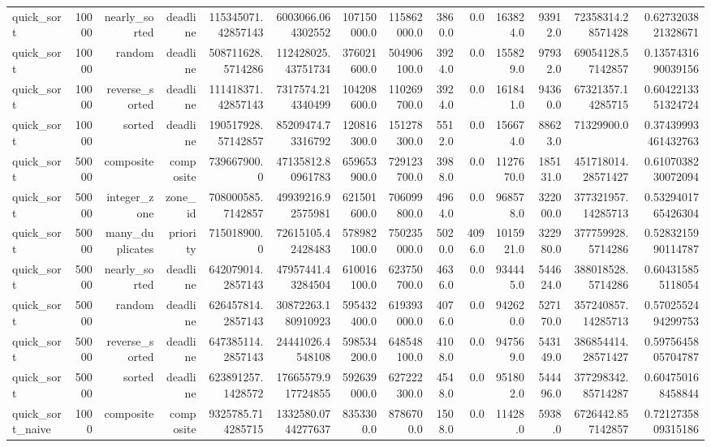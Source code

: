 \begin{table}[htbp]
\begin{tabular}{lrrrrrrrrrrrrr}
quick_sort & 10000 & nearly_sorted & deadline & 115345071.42857143 & 6003066.064302552 & 107150000.0 & 115862000.0 & 3860.0 & 0.0 & 163824.0 & 93912.0 & 72358314.28571428 & 0.6273203821328671 \\
quick_sort & 10000 & random & deadline & 508711628.5714286 & 112428025.43751734 & 376021600.0 & 504906100.0 & 3924.0 & 0.0 & 155829.0 & 97932.0 & 69054128.57142857 & 0.1357431690039156 \\
quick_sort & 10000 & reverse_sorted & deadline & 111418371.42857143 & 7317574.214340499 & 104208600.0 & 110269700.0 & 3924.0 & 0.0 & 161841.0 & 94360.0 & 67321357.14285715 & 0.6042213351324724 \\
quick_sort & 10000 & sorted & deadline & 190517928.57142857 & 85209474.73316792 & 120816300.0 & 151278300.0 & 5512.0 & 0.0 & 156674.0 & 88623.0 & 71329900.0 & 0.37439993461432763 \\
quick_sort & 50000 & composite & composite & 739667900.0 & 47135812.80961783 & 659653900.0 & 729123700.0 & 3988.0 & 0.0 & 1127670.0 & 185131.0 & 451718014.28571427 & 0.6107038230072094 \\
quick_sort & 50000 & integer_zone & zone_id & 708000585.7142857 & 49939216.92575981 & 621501600.0 & 706099800.0 & 4964.0 & 0.0 & 968578.0 & 322000.0 & 377321957.14285713 & 0.5329401765426304 \\
quick_sort & 50000 & many_duplicates & priority & 715018900.0 & 72615105.42428483 & 578982100.0 & 750235000.0 & 5020.0 & 4096.0 & 1015921.0 & 322980.0 & 377759928.5714286 & 0.5283215990114787 \\
quick_sort & 50000 & nearly_sorted & deadline & 642079014.2857143 & 47957441.43284504 & 610016100.0 & 623750700.0 & 4636.0 & 0.0 & 934445.0 & 544624.0 & 388018528.5714286 & 0.604315855118054 \\
quick_sort & 50000 & random & deadline & 626457814.2857143 & 30872263.180910923 & 595432400.0 & 619393000.0 & 4076.0 & 0.0 & 942620.0 & 527170.0 & 357240857.14285713 & 0.5702552494299753 \\
quick_sort & 50000 & reverse_sorted & deadline & 647385114.2857143 & 24441026.4548108 & 598534200.0 & 648548100.0 & 4108.0 & 0.0 & 947569.0 & 543149.0 & 386854414.28571427 & 0.5975645805704787 \\
quick_sort & 50000 & sorted & deadline & 623891257.1428572 & 17665579.917724855 & 592639000.0 & 627222300.0 & 4548.0 & 0.0 & 951802.0 & 544496.0 & 377298342.85714287 & 0.604750168458844 \\
quick_sort_naive & 1000 & composite & composite & 9325785.714285715 & 1332580.0744277637 & 8353300.0 & 8786700.0 & 1508.0 & 0.0 & 11428.0 & 5938.0 & 6726442.857142857 & 0.7212735809315186 \\

\end{tabular}
\end{table}
